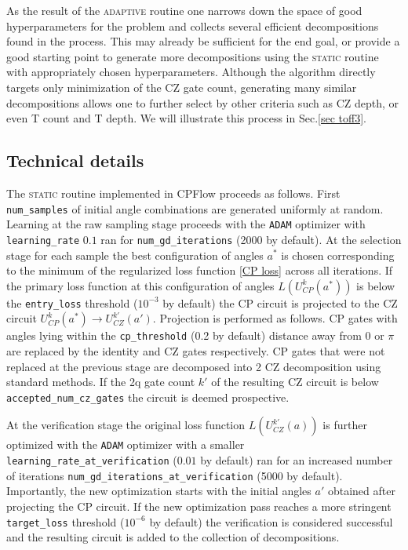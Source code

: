 \documentclass[twocolumn, amsfonts, amssymb, aps, nofootinbib]{revtex4-2}
\newcommand{\CZ}{\textsf{CZ }}
\newcommand{\CP}{\textsf{CP }}
\newcommand{\T}{\textsf{T }}
\newcommand{\package}[1]{\textrm {#1 }}
\newcommand{\cpflow}{\package{CPFlow}}
\newcommand{\static}{\textsc{static }}
\newcommand{\adaptive}{\textsc{adaptive }}
\newcommand{\param}[1]{\texttt{#1}}
\begin{document}
As the result of the \adaptive routine one narrows down the space of good hyperparameters for the problem and collects several efficient decompositions found in the process. This may already be sufficient for the end goal, or provide a good starting point to generate more decompositions using the \static routine with appropriately chosen hyperparameters. Although the algorithm directly targets only minimization of the \CZ gate count, generating many similar decompositions allows one to further select by other criteria such as \CZ depth, or even \T count and \T depth. We will illustrate this process in Sec.\ref{sec toff3}.

\subsection{Technical details \label{sec details}}

The \static routine implemented in \cpflow proceeds as follows.
First \param{num\_samples} of initial angle combinations are generated uniformly at random. Learning at the raw sampling stage proceeds with the \param{ADAM} optimizer with \param{learning\_rate} $0.1$ ran for \param{num\_gd\_iterations} (2000 by default).
At the selection stage for each sample the best configuration of angles $a^*$ is chosen corresponding to the minimum of the regularized loss function \eqref{CP loss} across all iterations. If the primary loss function at this configuration of angles $L(U_{CP}^k(a^*))$ is below the \param{entry\_loss} threshold ($10^{-3}$ by default) the \CP circuit is projected to the \CZ circuit $U_{CP}^k(a^*)\to U_{CZ}^{k'}(a')$. Projection is performed as follows. \CP gates with angles lying within the \param{cp\_threshold}  (0.2 by default) distance away from $0$ or $\pi$ are replaced by the identity and \CZ gates respectively.  \CP gates that were not replaced at the previous stage are decomposed into 2 \CZ decomposition using standard methods. If the 2q gate count $k'$ of the resulting \CZ circuit is below \param{accepted\_num\_cz\_gates} the circuit is deemed prospective.

At the verification stage the original loss function $L(U_{CZ}^{k'}(a))$ is further optimized with the \param{ADAM} optimizer with a smaller \param{learning\_rate\_at\_verification} ($0.01$ by default) ran for an increased number of iterations \param{num\_gd\_iterations\_at\_verification} (5000 by default). Importantly, the new optimization starts with the initial angles $a'$ obtained after projecting the \CP circuit. If the new optimization pass reaches a more stringent \param{target\_loss} threshold ($10^{-6}$ by default) the verification is considered successful and the resulting circuit is added to the collection of decompositions.
\end{document}
